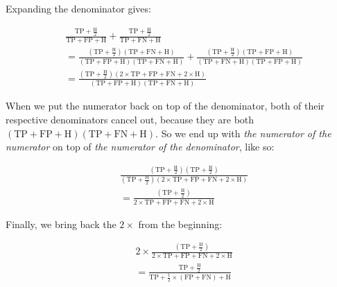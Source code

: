 \documentclass[a4paper,10pt]{article} %
\begin{document}
\noindent Expanding the denominator gives:

\begin{align*}
    &\frac{\text{TP}+\frac{\text{H}}{2}}
    {\text{TP}+\text{FP}+\text{H}}
    +
    \frac{\text{TP}+\frac{\text{H}}{2}}
    {\text{TP}+\text{FN}+\text{H}}\\[1.5ex]
    &=
    \frac{\left(
        \text{TP}+\frac{\text{H}}{2}
    \right)\left(
        \text{TP}+\text{FN}+\text{H}
    \right)}
    {\left(
        \text{TP}+\text{FP}+\text{H}
    \right)\left(
        \text{TP}+\text{FN}+\text{H}
    \right)}
    +
    \frac{\left(
        \text{TP}+\frac{\text{H}}{2}
    \right)\left(
        \text{TP}+\text{FP}+\text{H}
    \right)}
    {\left(
        \text{TP}+\text{FN}+\text{H}
    \right)\left(
        \text{TP}+\text{FP}+\text{H}
    \right)}\\[1.5ex]
    &=\frac{\left(
        \text{TP}+\frac{\text{H}}{2}
    \right)\left(
        2\times\text{TP} + \text{FP} + \text{FN} + 2\times\text{H}
    \right)}
    {\left(
        \text{TP}+\text{FP}+\text{H}
    \right)\left(
        \text{TP}+\text{FN}+\text{H}
    \right)}
\end{align*}

\noindent When we put the numerator back on top of the denominator, both of their respective denominators cancel out, because they are both $(\text{TP}+\text{FP}+\text{H})(\text{TP}+\text{FN}+\text{H})$.
So we end up with \emph{the numerator of the numerator} on top of \emph{the numerator of the denominator}, like so:

\begin{align*}
    &\frac{\left(
        \text{TP}+\frac{\text{H}}{2}
    \right)\left(
        \text{TP}+\frac{\text{H}}{2}
    \right)}
    {\left(
        \text{TP}+\frac{\text{H}}{2}
    \right)\left(
        2\times\text{TP} + \text{FP} + \text{FN} + 2\times\text{H}
    \right)}\\[1.5ex]
    &=
    \frac{\left(
        \text{TP}+\frac{\text{H}}{2}
    \right)}
    {2\times\text{TP} + \text{FP} + \text{FN} + 2\times\text{H}}
\end{align*}

\noindent Finally, we bring back the $2\times$ from the beginning:

\begin{align*}
    &2\times\frac{\left(
        \text{TP}+\frac{\text{H}}{2}
    \right)}
    {2\times\text{TP} + \text{FP} + \text{FN} + 2\times\text{H}}\\[1ex]
    &=
    \frac{\text{TP}+\frac{\text{H}}{2}}
    {\text{TP} + \frac{1}{2}\times(\text{FP} + \text{FN}) + \text{H}}
\end{align*}
\end{document}
